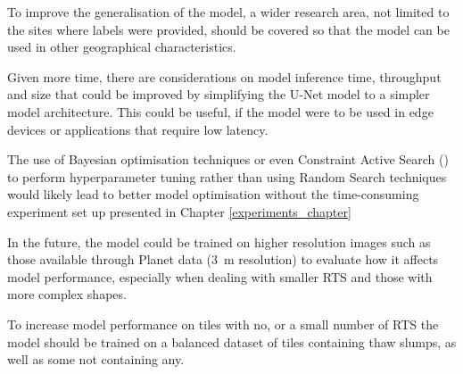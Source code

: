 To improve the generalisation of the model, a wider research area, not limited to the sites where labels were provided, should be covered so that the model can be used in other geographical characteristics.

Given more time, there are considerations on model inference time, throughput and size that could be improved by simplifying the U-Net model to a simpler model architecture. This could be useful, if the model were to be used in edge devices or applications that require low latency.

The use of Bayesian optimisation techniques or even Constraint Active Search (\cite{pmlr-v139-malkomes21a}) to perform hyperparameter tuning rather than using Random Search techniques would likely lead to better model optimisation without the time-consuming experiment set up presented in Chapter \ref{experiments_chapter}

In the future, the model could be trained on higher resolution images such as those available through Planet data (\SI{3}{\metre} resolution) to evaluate how it affects model performance, especially when dealing with smaller  \gls{RTS} and those with more complex shapes.

To increase model performance on tiles with no, or a small number of \gls{RTS} the model should be trained on a balanced dataset of tiles containing thaw slumps, as well as some not containing any.